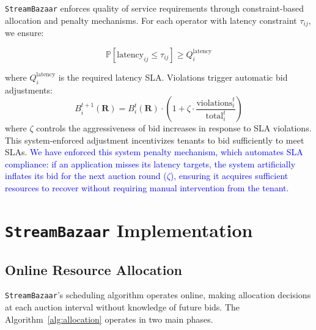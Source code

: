 \documentclass[lettersize,journal]{IEEEtran}
\begin{document}
\texttt{StreamBazaar} enforces quality of service requirements through constraint-based allocation and penalty mechanisms. For each operator with latency constraint $\tau_{ij}$, we ensure:

\begin{equation}
\mathbb{P}[\text{latency}_{ij} \leq \tau_{ij}] \geq Q_i^{\text{latency}}
\end{equation}

where $Q_i^{\text{latency}}$ is the required latency SLA. Violations trigger automatic bid adjustments:
\begin{equation}
B_i^{t+1}(\mathbf{R}) = B_i^t(\mathbf{R}) \cdot \left(1 + \zeta \cdot \frac{\text{violations}_i^t}{\text{total}_i^t}\right)
\end{equation}
where $\zeta$ controls the aggressiveness of bid increases in response to SLA violations. This system-enforced adjustment incentivizes tenants to bid sufficiently to meet SLAs. \textcolor{blue}{We have enforced this system penalty mechanism, which automates SLA compliance: if an application misses its latency targets, the system artificially inflates its bid for the next auction round ($\zeta$), ensuring it acquires sufficient resources to recover without requiring manual intervention from the tenant.}


\section{\texttt{StreamBazaar} Implementation}
\label{sec:scheduling_algorithm}

\subsection{Online Resource Allocation}
\label{subsec:online_allocation}

\texttt{StreamBazaar}'s scheduling algorithm operates online, making allocation decisions at each auction interval without knowledge of future bids. 
The Algorithm~\ref{alg:allocation} operates in two main phases. 
\end{document}
